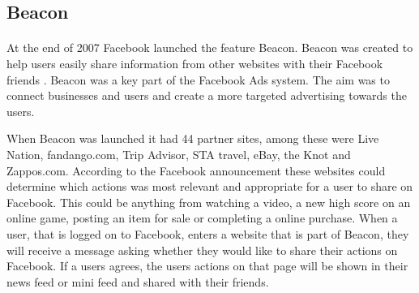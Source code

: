 



\subsection{Beacon}
\paragraph{}
At the end of 2007 Facebook launched the feature Beacon. Beacon was created to help users easily share information from other websites with their Facebook friends \cite{BeaconWebsites}. Beacon was a key part of the Facebook Ads system. The aim was to connect businesses and users and create a more targeted advertising towards the users. 

When Beacon was launched it had 44 partner sites, among these were Live Nation, fandango.com, Trip Advisor, STA travel, eBay, the Knot and Zappos.com. According to the Facebook announcement \cite{BeaconWebsites} these websites could determine which actions was most relevant and appropriate for a user to share on Facebook. This could be anything from watching a video, a new high score on an online game, posting an item for sale or completing a online purchase. When a user, that is logged on to Facebook, enters a website that is part of Beacon, they will receive a message asking whether they would like to share their actions on Facebook. If a users agrees, the users actions on that page will be shown in their news feed or mini feed and shared with their friends.  

